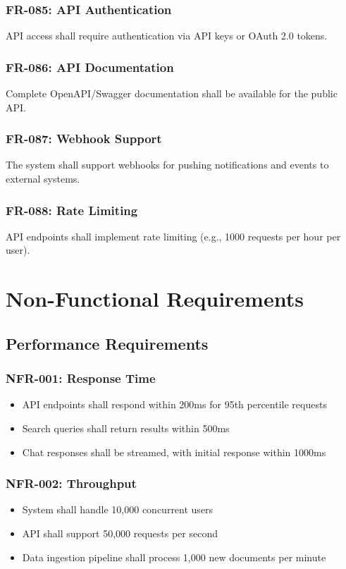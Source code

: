 \documentclass{report}
\begin{document}
\subsection{FR-085: API Authentication}
API access shall require authentication via API keys or OAuth 2.0 tokens.

\subsection{FR-086: API Documentation}
Complete OpenAPI/Swagger documentation shall be available for the public API.

\subsection{FR-087: Webhook Support}
The system shall support webhooks for pushing notifications and events to external systems.

\subsection{FR-088: Rate Limiting}
API endpoints shall implement rate limiting (e.g., 1000 requests per hour per user).

\chapter{Non-Functional Requirements}

\section{Performance Requirements}

\subsection{NFR-001: Response Time}
\begin{itemize}
    \item API endpoints shall respond within 200ms for 95th percentile requests
    \item Search queries shall return results within 500ms
    \item Chat responses shall be streamed, with initial response within 1000ms
\end{itemize}

\subsection{NFR-002: Throughput}
\begin{itemize}
    \item System shall handle 10,000 concurrent users
    \item API shall support 50,000 requests per second
    \item Data ingestion pipeline shall process 1,000 new documents per minute
\end{itemize}
\end{document}
